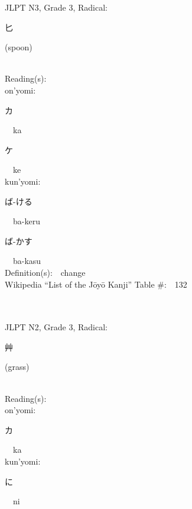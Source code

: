 \begin{multicols}{2}
{JLPT N3, Grade 3, Radical:\ \ {\begin{CJK}{UTF8}{min} 匕 \end{CJK}} (spoon) } \\
Reading(s):\ \ \\
{\hspace*{1em}}on'yomi:\ \ \\
{\hspace*{2em}}{\begin{CJK}{UTF8}{min} カ \end{CJK}}\ \ ka\ \ \\
{\hspace*{2em}}{\begin{CJK}{UTF8}{min} ケ \end{CJK}}\ \ ke\ \ \\
{\hspace*{1em}}kun'yomi:\ \ \\
{\hspace*{2em}}{\begin{CJK}{UTF8}{min} ば-ける \end{CJK}}\ \ ba-keru\ \ \\
{\hspace*{2em}}{\begin{CJK}{UTF8}{min} ば-かす \end{CJK}}\ \ ba-kasu\ \ \\
Definition(s):\ \ change \\
Wikipedia ``List of the J\=oy\=o Kanji'' Table \#:\ \ 132 \\
\ \ \\
{\fontsize{34pt}{40pt}  }\ \ \\  %
{JLPT N2, Grade 3, Radical:\ \ {\begin{CJK}{UTF8}{min} 艸 \end{CJK}} (grass) } \\
Reading(s):\ \ \\
{\hspace*{1em}}on'yomi:\ \ \\
{\hspace*{2em}}{\begin{CJK}{UTF8}{min} カ \end{CJK}}\ \ ka\ \ \\
{\hspace*{1em}}kun'yomi:\ \ \\
{\hspace*{2em}}{\begin{CJK}{UTF8}{min} に \end{CJK}}\ \ ni\ \ \\

\end{multicols}
